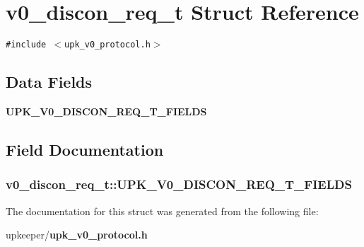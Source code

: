 \section{v0\_\-discon\_\-req\_\-t Struct Reference}
\label{structv0__discon__req__t}
{\tt \#include $<$upk\_\-v0\_\-protocol.h$>$}

\subsection*{Data Fields}
\begin{CompactItemize}
\item 
\bf{UPK\_\-V0\_\-DISCON\_\-REQ\_\-T\_\-FIELDS}
\end{CompactItemize}


\subsection{Field Documentation}
\subsubsection{\setlength{\rightskip}{0pt plus 5cm}\bf{v0\_\-discon\_\-req\_\-t::UPK\_\-V0\_\-DISCON\_\-REQ\_\-T\_\-FIELDS}}\label{structv0__discon__req__t_489ce15b032390346f7022ae06fc653e}




The documentation for this struct was generated from the following file:\begin{CompactItemize}
\item 
upkeeper/\bf{upk\_\-v0\_\-protocol.h}\end{CompactItemize}

